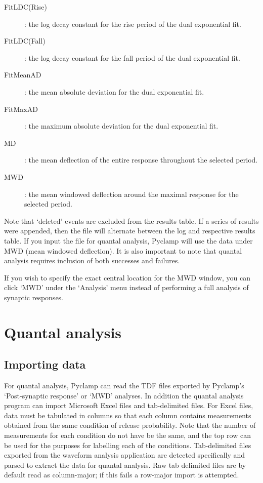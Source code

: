 \documentclass{article}
\begin{document}
\begin{description}
	\item[FitLDC(Rise)]: the log decay constant for the rise period of the dual exponential fit.
	\item[FitLDC(Fall)]: the log decay constant for the fall period of the dual exponential fit.
	\item[FitMeanAD]: the mean absolute deviation for the dual exponential fit.
	\item[FitMaxAD]: the maximum absolute deviation for the dual exponential fit.
	\item[MD]: the mean deflection of the entire response throughout the selected period.
	\item[MWD]: the mean windowed deflection around the maximal response for the selected period.
\end{description}

Note that `deleted' events are excluded from the results table. If a series of results were appended, then the file will
alternate between the log and respective results table. If you input the file for quantal analysis, Pyclamp will use the
data under MWD (mean windowed deflection). It is also important to note that quantal analysis requires inclusion of both
successes and failures.

If you wish to specify the exact central location for the MWD window, you can click `MWD' under the `Analysis' menu
instead of performing a full analysis of synaptic responses.

\section{Quantal analysis}

\subsection{Importing data}

For quantal analysis, Pyclamp can read the TDF files exported by Pyclamp's  `Post-synaptic response' or `MWD' analyses.
In addition the quantal analysis program can import Microsoft Excel files and tab-delimited files. For Excel files, data
must be tabulated in columns so that each column contains measurements obtained from the same condition of release
probability. Note that the number of measurements for each condition do not have be the same, and the top row can be
used for the purposes for labelling each of the conditions. Tab-delimited files exported from the waveform analysis
application are detected specifically and parsed to extract the data for quantal analysis. Raw tab delimited files are
by default read as column-major; if this fails a row-major import is attempted.
\end{document}
